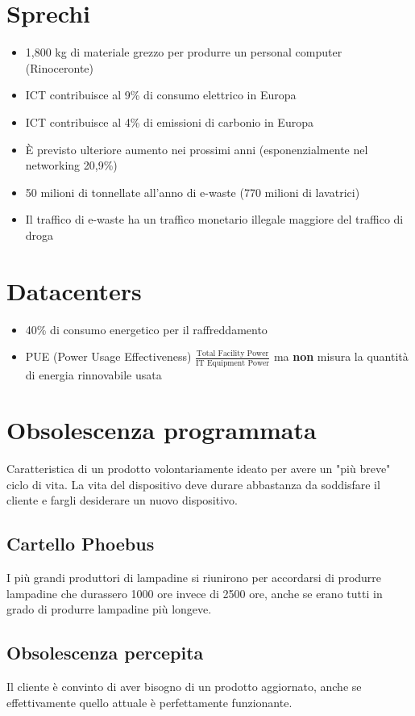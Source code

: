 \documentclass[a4paper, 12pt]{report}
\begin{document}
      \section{Sprechi}
      \begin{itemize}
        \item 1,800 kg di materiale grezzo per produrre un personal computer (Rinoceronte)
        \item ICT contribuisce al 9\% di consumo elettrico in Europa 
        \item ICT contribuisce al 4\% di emissioni di carbonio in Europa
        \item È previsto ulteriore aumento nei prossimi anni (esponenzialmente nel networking 20,9\%) 
        \item 50 milioni di tonnellate all'anno di e-waste (770 milioni di lavatrici)
        \item Il traffico di e-waste ha un traffico monetario illegale maggiore del traffico di droga
      \end{itemize}
      \section{Datacenters}
      \begin{itemize}
        \item 40\% di consumo energetico per il raffreddamento
        \item PUE (Power Usage Effectiveness) $\frac{\text{Total Facility Power}}{\text{IT Equipment Power}}$ ma \textbf{non} misura la quantità di energia rinnovabile usata
      \end{itemize}
      \section{Obsolescenza programmata}
      Caratteristica di un prodotto volontariamente ideato per avere un "più breve" ciclo di vita.
      La vita del dispositivo deve durare abbastanza da soddisfare il cliente e fargli desiderare un nuovo dispositivo.
      \subsection{Cartello Phoebus}
      I più grandi produttori di lampadine si riunirono per accordarsi di produrre lampadine che durassero
      1000 ore invece di 2500 ore, anche se erano tutti in grado di produrre lampadine più longeve.
      \subsection{Obsolescenza percepita}
      Il cliente è convinto di aver bisogno di un prodotto aggiornato, anche se effettivamente quello attuale è perfettamente funzionante.
\end{document}
